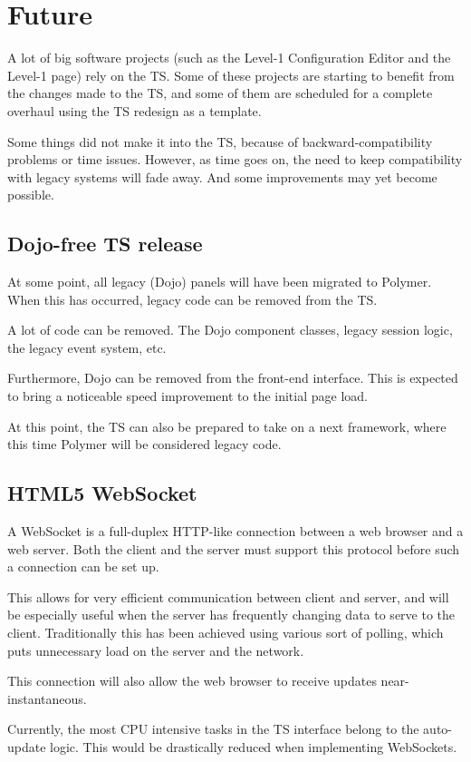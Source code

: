 \chapter{Future}
A lot of big software projects (such as the Level-1 Configuration Editor and
the Level-1 page) rely on the TS.
Some of these projects are starting to benefit from the changes made to the TS,
and some of them are scheduled for a complete overhaul using the TS redesign as
a template.

Some things did not make it into the TS, because of backward-compatibility problems
or time issues.
However, as time goes on, the need to keep compatibility with legacy systems will
fade away. And some improvements may yet become possible.

\section{Dojo-free TS release}
At some point, all legacy (Dojo) panels will have been migrated to Polymer.
When this has occurred, legacy code can be removed from the TS.

A lot of code can be removed. The Dojo component classes, legacy session logic,
the legacy event system, etc.

Furthermore, Dojo can be removed from the front-end interface. This is expected
to bring a noticeable speed improvement to the initial page load.

At this point, the TS can also be prepared to take on a next framework, where this
time Polymer will be considered legacy code.

\section{HTML5 WebSocket}
A WebSocket is a full-duplex HTTP-like connection between a web browser and a web server.
Both the client and the server must support this protocol before such a connection
can be set up.

This allows for very efficient communication between client and server, and will
be especially useful when the server has frequently changing data to serve to the
client.
Traditionally this has been achieved using various sort of polling, which puts
unnecessary load on the server and the network.

This connection will also allow the web browser to receive updates near-instantaneous.

Currently, the most CPU intensive tasks in the TS interface belong to the auto-update
logic. This would be drastically reduced when implementing WebSockets.

